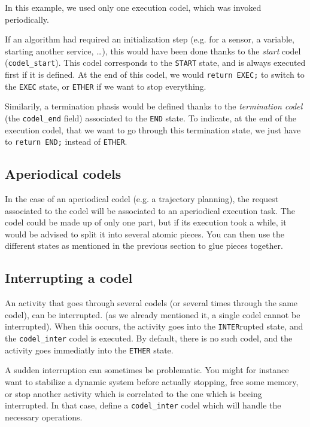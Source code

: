 In this example,   we used only  one execution  codel, which  was invoked
periodically.

If an algorithm had required an  initialization step (e.g.  for a sensor,
a variable, starting another service, \ldots), this  would have been done
thanks to the \emph{start} codel (\texttt{codel\_start}).  This codel
corresponds to the \texttt{START} state, and  is always executed first if it
is  defined. At the  end  of this codel,  we  would \texttt{return EXEC;} to
switch to  the \texttt{EXEC} state, or   \texttt{ETHER} if   we  want to  stop
everything.

Similarily, a termination phasis   would be defined   thanks to the  {\em
termination codel} (the \texttt{codel\_end} field) associated to the
\texttt{END} state. To indicate, at the end of  the execution codel, that we
want to go through this  termination state, we just  have to \texttt{return
END;} instead of \texttt{ETHER}.


\subsection{Aperiodical codels}

In  the case of  an aperiodical codel (e.g.   a trajectory planning), the
request associated  to the codel  will be  associated to  an  aperiodical
execution task. The codel  could be made up of  only one part, but if its
execution took  a while,  it  would be advised  to  split it into several
atomic pieces.  You can then use the different states as mentioned in the
previous section to glue pieces together.


\subsection{Interrupting a codel}

An activity that  goes through several  codels (or  several times through
the  same codel), can  be  interrupted.  (as  we already  mentioned it, a
single codel cannot be interrupted). When  this occurs, the activity goes
into the  \texttt{INTER}rupted  state,  and the  \texttt{codel\_inter}
codel is executed.  By default, there is  no such codel, and the activity
goes immediatly into the \texttt{ETHER} state.

A  sudden  interruption can   sometimes  be problematic.  You  might  for
instance  want  to stabilize a dynamic   system before actually stopping,
free some memory, or stop another activity which is correlated to the one
which   is  beeing     interrupted.  In   that  case,   define    a  
\texttt{codel\_inter} codel which will handle the necessary operations.


